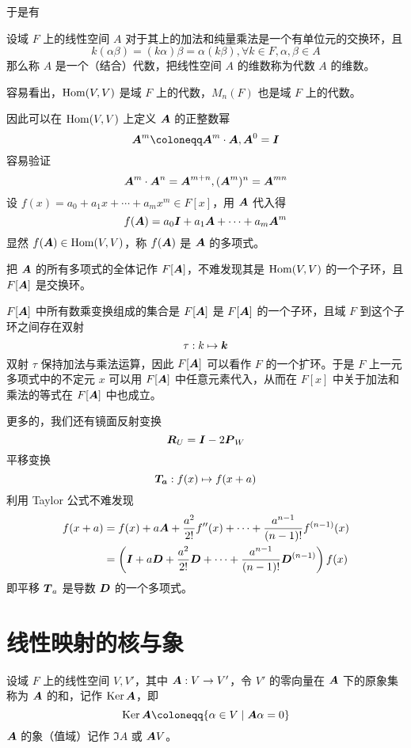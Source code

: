 于是有

\begin{definition}[代数]
	设域 $F$ 上的线性空间 $A$ 对于其上的加法和纯量乘法是一个有单位元的交换环，且
	\[ k(\alpha \beta) = (k\alpha)\beta = \alpha(k\beta), \forall k \in F,\alpha,\beta \in A \]
	那么称 $A$ 是一个（结合）代数，把线性空间 $A$ 的维数称为代数 $A$ 的维数。
\end{definition}

容易看出，$\operatorname{Hom}(V,V)$ 是域 $F$ 上的代数，$M_n(F)$ 也是域 $F$ 上的代数。

因此可以在 $\operatorname{Hom}(V,V)$ 上定义 $\boldsymbol{A}$ 的正整数幂
\[ \vbf{A}^m \coloneqq \vbf{A}^m \cdot \vbf{A}, \vbf{A}^0 = \vbf{I} \]
容易验证
\[ \boldsymbol{A}^m \cdot \boldsymbol{A}^n = \boldsymbol{A}^{m+n}, (\boldsymbol{A}^m)^n = \boldsymbol{A}^{mn} \]
设 $f(x) = a_0 + a_1 x + \cdots + a_mx^m \in F[x]$，用 $\boldsymbol{A}$ 代入得
\[ f(\boldsymbol{A}) = a_0\boldsymbol{I} + a_1\boldsymbol{A} + \cdots + a_m \boldsymbol{A}^m \]
显然 $f(\boldsymbol{A}) \in \operatorname{Hom}(V,V)$，称 $f(\boldsymbol{A})$ 是 $\boldsymbol{A}$ 的多项式。

把 $\boldsymbol{A}$ 的所有多项式的全体记作 $F[\boldsymbol{A}]$，不难发现其是 $\operatorname{Hom}(V,V)$ 的一个子环，且 $F[\boldsymbol{A}]$ 是交换环。

$F[\boldsymbol{A}]$ 中所有数乘变换组成的集合是 $F[\boldsymbol{A}]$ 是 $F[\boldsymbol{A}]$ 的一个子环，且域 $F$ 到这个子环之间存在双射
\[ \tau : k \mapsto \boldsymbol{k} \]
双射 $\tau$ 保持加法与乘法运算，因此 $F[\boldsymbol{A}]$ 可以看作 $F$ 的一个扩环。于是 $F$ 上一元多项式中的不定元 $x$ 可以用 $F[\boldsymbol{A}]$ 中任意元素代入，从而在 $F[x]$ 中关于加法和乘法的等式在 $F[\boldsymbol{A}]$ 中也成立。

更多的，我们还有镜面反射变换
\[ \boldsymbol{R}_U = \boldsymbol{I} - 2\boldsymbol{P}_W \]
平移变换
\[ \boldsymbol{T_a} : f(x) \mapsto f(x+a) \]
利用 Taylor 公式不难发现
\[
	\begin{aligned}
		f(x+a) & = f(x) + a\boldsymbol{A} + \frac{a^2}{2!}f''(x) + \cdots + \frac{a^{n-1}}{(n-1)!} f^{(n-1)}(x)							\\
			   & = \left( \boldsymbol{I} + a\boldsymbol{D} + \frac{a^2}{2!}\boldsymbol{D} + \cdots + \frac{a^{n-1}}{(n-1)!} \boldsymbol{D}^{(n-1)} \right)f(x)
	\end{aligned}
\]
即平移 $\boldsymbol{T}_a$ 是导数 $\boldsymbol{D}$ 的一个多项式。

\section{线性映射的核与象}

\begin{definition}[核] 
	设域 $F$ 上的线性空间 $V,V'$，其中 $\boldsymbol{A} : V \to V'$，令 $V'$ 的零向量在 $\boldsymbol{A}$ 下的原象集称为 $\boldsymbol{A}$ 的和，记作 $\operatorname{Ker} \boldsymbol{A}$，即
	\[ \Ker \vbf{A} \coloneqq \{ \alpha \in V \mid \vbf{A}\alpha = 0 \} \]
	$\boldsymbol{A}$ 的象（值域）记作 $\Im A$ 或 $\boldsymbol{A} V$。
\end{definition}

